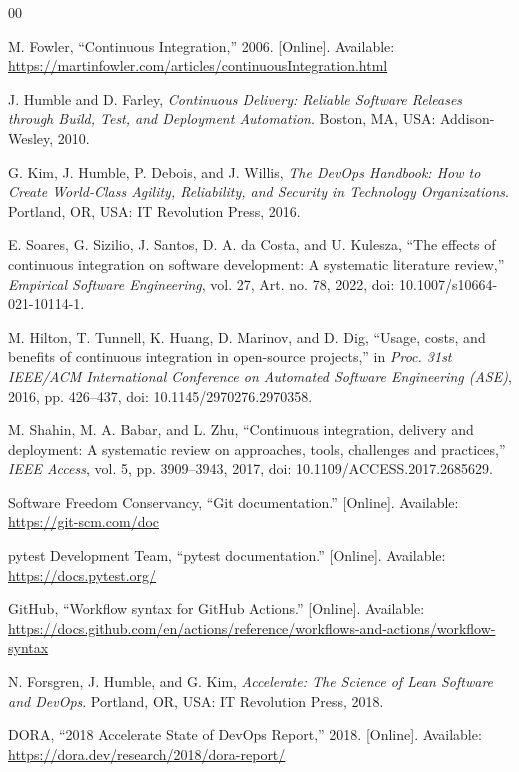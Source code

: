 \documentclass[conference]{IEEEtran}
\begin{document}
\begin{thebibliography}{00}

M. Fowler, ``Continuous Integration,'' 2006. [Online]. Available: \url{https://martinfowler.com/articles/continuousIntegration.html}

J. Humble and D. Farley, \textit{Continuous Delivery: Reliable Software Releases through Build, Test, and Deployment Automation}. Boston, MA, USA: Addison-Wesley, 2010.

G. Kim, J. Humble, P. Debois, and J. Willis, \textit{The DevOps Handbook: How to Create World-Class Agility, Reliability, and Security in Technology Organizations}. Portland, OR, USA: IT Revolution Press, 2016.

E. Soares, G. Sizilio, J. Santos, D. A. da Costa, and U. Kulesza, ``The effects of continuous integration on software development: A systematic literature review,'' \textit{Empirical Software Engineering}, vol. 27, Art. no. 78, 2022, doi: 10.1007/s10664-021-10114-1.

M. Hilton, T. Tunnell, K. Huang, D. Marinov, and D. Dig, ``Usage, costs, and benefits of continuous integration in open-source projects,'' in \textit{Proc. 31st IEEE/ACM International Conference on Automated Software Engineering (ASE)}, 2016, pp. 426--437, doi: 10.1145/2970276.2970358.

M. Shahin, M. A. Babar, and L. Zhu, ``Continuous integration, delivery and deployment: A systematic review on approaches, tools, challenges and practices,'' \textit{IEEE Access}, vol. 5, pp. 3909--3943, 2017, doi: 10.1109/ACCESS.2017.2685629.

Software Freedom Conservancy, ``Git documentation.'' [Online]. Available: \url{https://git-scm.com/doc}

pytest Development Team, ``pytest documentation.'' [Online]. Available: \url{https://docs.pytest.org/}

GitHub, ``Workflow syntax for GitHub Actions.'' [Online]. Available: \url{https://docs.github.com/en/actions/reference/workflows-and-actions/workflow-syntax}

N. Forsgren, J. Humble, and G. Kim, \textit{Accelerate: The Science of Lean Software and DevOps}. Portland, OR, USA: IT Revolution Press, 2018.

DORA, ``2018 Accelerate State of DevOps Report,'' 2018. [Online]. Available: \url{https://dora.dev/research/2018/dora-report/}

\end{thebibliography}
\end{document}
